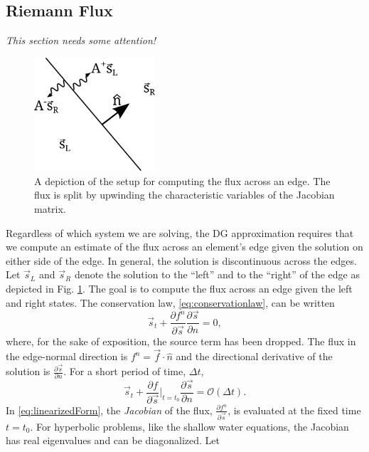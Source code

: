 \documentclass{softwaremanual}
\begin{document}
\subsection{Riemann Flux}
\textit{This section needs some attention!}\\
\begin{figure}
\begin{center}
\includegraphics[width=0.4\textwidth]{figures/normalflux.png}
\caption{ A depiction of the setup for computing the flux across an edge. The flux is split by upwinding the characteristic variables of the Jacobian matrix. }\label{fig:normalflux}
\end{center}
\end{figure}
Regardless of which system we are solving, the DG approximation requires that we compute an estimate of the flux across an element's edge given the solution on either side of the edge. In general, the solution is discontinuous across the edges. Let $\vec{s}_L$ and $\vec{s}_R$ denote the solution to the ``left'' and to the ``right'' of the edge as depicted in Fig. \ref{fig:normalflux}. The goal is to compute the flux across an edge given the left and right states. The conservation law, \eqref{eq:conservationlaw}, can be written
\begin{equation}
\vec{s}_t + \frac{\partial f^n}{\partial \vec{s}}\frac{\partial \vec{s}}{\partial n} = 0,
\end{equation}
where, for the sake of exposition, the source term has been dropped. The flux in the edge-normal direction is $f^n = \vec{f} \cdot \hat{n}$ and the directional derivative of the solution is $\frac{\partial \vec{s}}{\partial n}$. For a short period of time, $\Delta t$,
\begin{equation}
\vec{s}_t + \frac{\partial f}{\partial \vec{s}}|_{t=t_0} \frac{\partial \vec{s}}{\partial n}  = \mathcal{O}(\Delta t). \label{eq:linearizedForm}
\end{equation}
In \eqref{eq:linearizedForm}, the \textit{Jacobian} of the flux, $\frac{\partial f^n}{\partial \vec{s}}$, is evaluated at the fixed time $t=t_0$. For hyperbolic problems, like the shallow water equations, the Jacobian has real eigenvalues and can be diagonalized. Let
\end{document}
